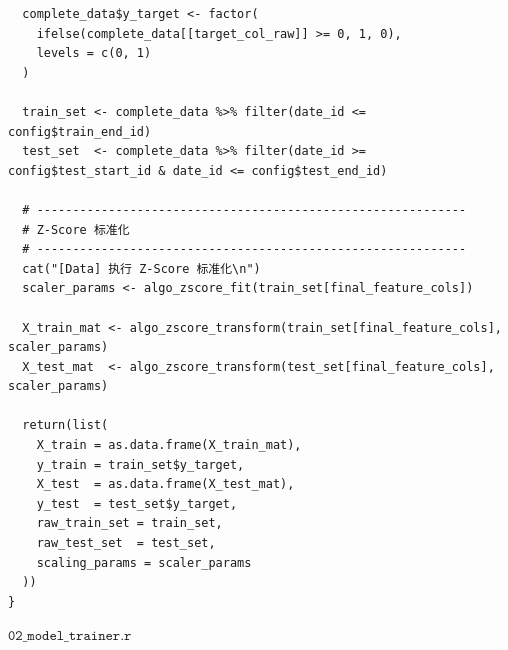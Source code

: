 \documentclass[11pt, a4paper]{article}
\begin{document}
\begin{verbatim}
  complete_data$y_target <- factor(
    ifelse(complete_data[[target_col_raw]] >= 0, 1, 0), 
    levels = c(0, 1)
  )
  
  train_set <- complete_data %>% filter(date_id <= config$train_end_id)
  test_set  <- complete_data %>% filter(date_id >= config$test_start_id & date_id <= config$test_end_id)
  
  # ------------------------------------------------------------
  # Z-Score 标准化
  # ------------------------------------------------------------
  cat("[Data] 执行 Z-Score 标准化\n")
  scaler_params <- algo_zscore_fit(train_set[final_feature_cols])
  
  X_train_mat <- algo_zscore_transform(train_set[final_feature_cols], scaler_params)
  X_test_mat  <- algo_zscore_transform(test_set[final_feature_cols], scaler_params)
  
  return(list(
    X_train = as.data.frame(X_train_mat),
    y_train = train_set$y_target,
    X_test  = as.data.frame(X_test_mat),
    y_test  = test_set$y_target,
    raw_train_set = train_set,
    raw_test_set  = test_set,
    scaling_params = scaler_params
  ))
}
\end{verbatim}
$\texttt{02\_model\_trainer.r}$
\end{document}
